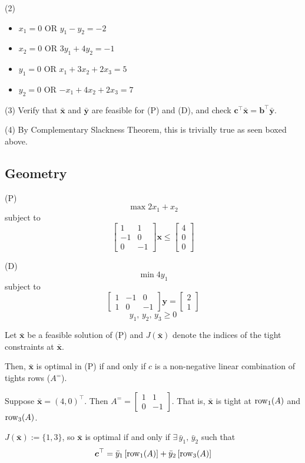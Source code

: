 \begin{exbox}
\begin{example}
        (2)
        \begin{itemize}
            \item $ x_1=0 $ OR $ \boxed{y_1-y_2=-2} $
            \item $ \boxed{x_2=0} $ OR $ 3y_1+4y_2=-1 $
            \item $ y_1=0 $ OR $ \boxed{x_1+3x_2+2x_3=5} $
            \item $ y_2=0 $ OR $ \boxed{-x_1+4x_2+2x_3=7} $
        \end{itemize}

        (3) Verify that $ \bm{\bar{x}} $ and $ \bm{\bar{y}} $ are
        feasible for (P) and (D), and check
        $ \bm{c}^\top \bm{\bar{x}}=\bm{b}^\top \bm{\bar{y}} $.

        (4) By Complementary Slackness Theorem, this is trivially true as seen boxed
        above.
    \end{example}
\end{exbox}

\subsection{Geometry}
(P) \[ \max 2x_1+x_2 \]
subject to
\[ \begin{bmatrix}
        1  & 1  \\
        -1 & 0  \\
        0  & -1
    \end{bmatrix}\bm{x}\le
    \begin{bmatrix}
        4 \\
        0 \\
        0
    \end{bmatrix} \]

(D)
\[ \min 4y_1 \]
subject to
\[ \begin{bmatrix}
        1 & -1 & 0  \\
        1 & 0  & -1
    \end{bmatrix}
    \bm{y}=
    \begin{bmatrix}
        2 \\
        1
    \end{bmatrix} \]
\[ y_1,\,y_2,\,y_3\geqslant  0 \]

Let $ \bm{\bar{x}} $ be a feasible solution of (P) and $ J(\bm{\bar{x}}) $
denote the indices of the tight constraints at $ \bm{\bar{x}} $.

Then, $ \bm{\bar{x}} $ is optimal in (P) if and only if $ c $ is a
non-negative linear combination of tights rows ($ A^= $).

Suppose $ \bm{\bar{x}}=(4,0)^\top $. Then $ A^= =\begin{bmatrix}
        1 & 1  \\
        0 & -1
    \end{bmatrix} $. That is, $ \bm{\bar{x}} $ is tight at $ \operatorname{row}_1(A) $
and $ \operatorname{row}_3(A) $.

$ J(\bm{\bar{x}}):=\{1,3\} $, so $ \bm{\bar{x}} $
is optimal if and only if $ \exists \, \bar{y}_1,\,\bar{y}_2 $ such that
\[ \bm{c}^\top=\bar{y}_1\left[ \operatorname{row}_1(A) \right]+\bar{y}_2 \left[ \operatorname{row}_3(A) \right] \]


